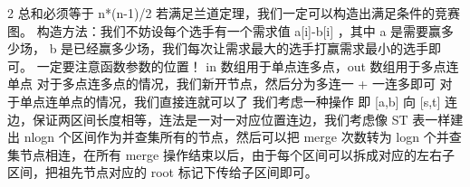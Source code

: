 {}\markdownRendererDollarSign{} 2 \markdownRendererDollarSign{}总和必须等于\markdownRendererDollarSign{} n*(n-1)/2 \markdownRendererDollarSign{}\markdownRendererParagraphSeparator
{}若满足兰道定理，我们一定可以构造出满足条件的竞赛图。\markdownRendererParagraphSeparator
{}构造方法：我们不妨设每个选手有一个需求值\markdownRendererDollarSign{} a[i]-b[i] \markdownRendererDollarSign{}，其中\markdownRendererDollarSign{} a \markdownRendererDollarSign{}是需要赢多少场，\markdownRendererDollarSign{} b \markdownRendererDollarSign{}是已经赢多少场，我们每次让需求最大的选手打赢需求最小的选手即可。\markdownRendererInterblockSeparator
{}
\markdownRendererSectionEnd 
\markdownRendererSectionEnd 
\markdownRendererSectionEnd \markdownRendererSectionBegin
{}\markdownRendererInterblockSeparator
{}\markdownRendererSectionBegin
{}\markdownRendererInterblockSeparator
{}一定要注意函数参数的位置！\markdownRendererParagraphSeparator
{}\markdownRendererDollarSign{}in\markdownRendererDollarSign{} 数组用于单点连多点，\markdownRendererDollarSign{}out\markdownRendererDollarSign{} 数组用于多点连单点\markdownRendererParagraphSeparator
{}对于多点连多点的情况，我们新开节点，然后分为多连一\markdownRendererDollarSign{} + \markdownRendererDollarSign{}一连多即可\markdownRendererParagraphSeparator
{}对于单点连单点的情况，我们直接连就可以了\markdownRendererInterblockSeparator
{}\markdownRendererInterblockSeparator
{}
\markdownRendererSectionEnd \markdownRendererSectionBegin
{}\markdownRendererInterblockSeparator
{}\markdownRendererInterblockSeparator
{}
\markdownRendererSectionEnd \markdownRendererSectionBegin
{}\markdownRendererInterblockSeparator
{}我们考虑一种操作 即\markdownRendererDollarSign{} [a,b] \markdownRendererDollarSign{}向\markdownRendererDollarSign{} [s,t] \markdownRendererDollarSign{}连边，保证两区间长度相等，连法是一对一对应位置连边，我们考虑像\markdownRendererDollarSign{} ST \markdownRendererDollarSign{}表一样建出\markdownRendererDollarSign{} nlogn \markdownRendererDollarSign{}个区间作为并查集所有的节点，然后可以把\markdownRendererDollarSign{} merge \markdownRendererDollarSign{}次数转为\markdownRendererDollarSign{} logn \markdownRendererDollarSign{}个并查集节点相连，在所有\markdownRendererDollarSign{} merge \markdownRendererDollarSign{}操作结束以后，由于每个区间可以拆成对应的左右子区间，把祖先节点对应的\markdownRendererDollarSign{} root \markdownRendererDollarSign{}标记下传给子区间即可。\markdownRendererParagraphSeparator
